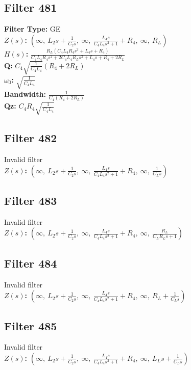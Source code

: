 \documentclass{article}
\begin{document}
\subsection*{Filter 481}
\textbf{Filter Type:} GE \\ 
\textbf{$Z(s)$:} $\left( \infty, \  L_{2} s + \frac{1}{C_{2} s}, \  \infty, \  \frac{L_{4} s}{C_{4} L_{4} s^{2} + 1} + R_{4}, \  \infty, \  R_{L}\right)$ \\ 
\textbf{$H(s)$:} $\frac{R_{L} \left(C_{4} L_{4} R_{4} s^{2} + L_{4} s + R_{4}\right)}{C_{4} L_{4} R_{4} s^{2} + 2 C_{4} L_{4} R_{L} s^{2} + L_{4} s + R_{4} + 2 R_{L}}$ \\ 
\textbf{Q:} $C_{4} \sqrt{\frac{1}{C_{4} L_{4}}} \left(R_{4} + 2 R_{L}\right)$ \\ 
\textbf{$\omega_0$:} $\sqrt{\frac{1}{C_{4} L_{4}}}$ \\ 
\textbf{Bandwidth:} $\frac{1}{C_{4} \left(R_{4} + 2 R_{L}\right)}$ \\ 
\textbf{Qz:} $C_{4} R_{4} \sqrt{\frac{1}{C_{4} L_{4}}}$ \\ 
\subsection*{Filter 482}
Invalid filter \\ 
\textbf{$Z(s)$:} $\left( \infty, \  L_{2} s + \frac{1}{C_{2} s}, \  \infty, \  \frac{L_{4} s}{C_{4} L_{4} s^{2} + 1} + R_{4}, \  \infty, \  \frac{1}{C_{L} s}\right)$ \\ 
\subsection*{Filter 483}
Invalid filter \\ 
\textbf{$Z(s)$:} $\left( \infty, \  L_{2} s + \frac{1}{C_{2} s}, \  \infty, \  \frac{L_{4} s}{C_{4} L_{4} s^{2} + 1} + R_{4}, \  \infty, \  \frac{R_{L}}{C_{L} R_{L} s + 1}\right)$ \\ 
\subsection*{Filter 484}
Invalid filter \\ 
\textbf{$Z(s)$:} $\left( \infty, \  L_{2} s + \frac{1}{C_{2} s}, \  \infty, \  \frac{L_{4} s}{C_{4} L_{4} s^{2} + 1} + R_{4}, \  \infty, \  R_{L} + \frac{1}{C_{L} s}\right)$ \\ 
\subsection*{Filter 485}
Invalid filter \\ 
\textbf{$Z(s)$:} $\left( \infty, \  L_{2} s + \frac{1}{C_{2} s}, \  \infty, \  \frac{L_{4} s}{C_{4} L_{4} s^{2} + 1} + R_{4}, \  \infty, \  L_{L} s + \frac{1}{C_{L} s}\right)$ \\ 
\end{document}
